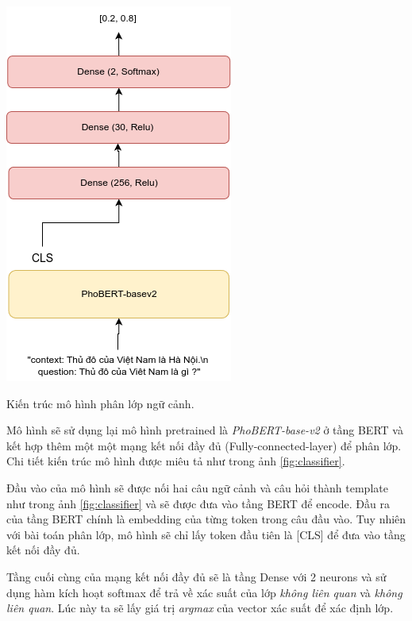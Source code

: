 \documentclass[a4paper, 12pt, openany]{book}
\begin{document}
\begin{minipage}{\linewidth}
    \centering
    \includegraphics[width=.6\linewidth]{./assets/images/classifier.drawio.png}
    \captionsetup{type=figure}
    \caption{Kiến trúc mô hình phân lớp ngữ cảnh.}
    \label{fig:classifier}
\end{minipage}
\vspace{0.5cm}

Mô hình sẽ sử dụng lại mô hình pretrained là \textit{PhoBERT-base-v2} \cite{phobert} ở tầng BERT và kết hợp thêm một một mạng kết nối đầy đủ
(Fully-connected-layer) để phân lớp. Chi tiết kiến trúc mô hình được miêu tả như trong ảnh \ref{fig:classifier}.

Đầu vào của mô hình sẽ được nối hai câu ngữ cảnh và câu hỏi thành template như trong ảnh \ref{fig:classifier}
và sẽ được đưa vào tầng BERT để encode. Đầu ra của tầng BERT chính là embedding của từng token trong câu đầu vào. Tuy nhiên với bài toán phân lớp,
mô hình sẽ chỉ lấy token đầu tiên là [CLS] để đưa vào tầng kết nối đầy đủ.

Tầng cuối cùng của mạng kết nối đầy đủ sẽ là tầng Dense với 2 neurons và sử dụng hàm kích hoạt softmax để trả về xác suất của lớp \textit{không liên quan} và \textit{không liên quan}.
Lúc này ta sẽ lấy giá trị \textit{argmax} của vector xác suất để xác định lớp.
\end{document}
